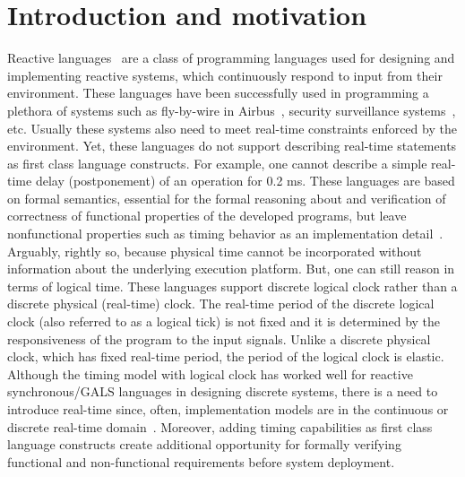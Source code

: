 \section{Introduction and motivation}
\label{sec:intr-motiv}

Reactive languages~\cite{gber931,amal10} are a class of programming
languages used for designing and implementing reactive systems, which
continuously respond to input from their environment. These languages
have been successfully used in programming a plethora of systems such as
fly-by-wire in Airbus~\cite{eairbus}, security surveillance
systems~\cite{amal121}, etc. Usually these systems also need to meet
real-time constraints enforced by the environment. Yet, these languages
do not support describing real-time statements as first class language
constructs.  For example, one cannot describe a simple real-time delay
(postponement) of an operation for 0.2 ms. These languages are based on
formal semantics, essential for the formal reasoning about and
verification of correctness of functional properties of the developed
programs, but leave nonfunctional properties such as timing behavior as
an implementation detail~\cite{boldt07}. Arguably, rightly so, because
physical time cannot be incorporated without information about the
underlying execution platform.  But, one can still reason in terms of
logical time. These languages support discrete logical clock rather than
a discrete physical (real-time) clock. The real-time period of the
discrete logical clock (also referred to as a logical tick) is not fixed
and it is determined by the responsiveness of the program to the input
signals. Unlike a discrete physical clock, which has fixed real-time
period, the period of the logical clock is elastic. Although the timing
model with logical clock has worked well for reactive synchronous/GALS
languages in designing discrete systems, there is a need to introduce
real-time since, often, implementation models are in the continuous or
discrete real-time domain~\cite{DBLP:journals/pieee/SifakisTY03}.
Moreover, adding timing capabilities as first class language constructs
create additional opportunity for formally verifying functional and
non-functional requirements before system deployment.



